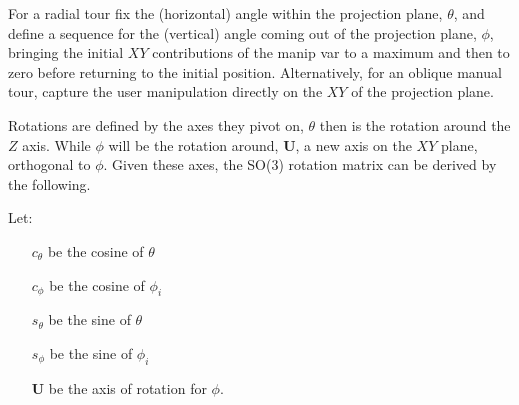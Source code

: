 For a radial tour fix the (horizontal) angle within the projection
plane, \(\theta\), and define a sequence for the (vertical) angle coming
out of the projection plane, \(\phi\), bringing the initial \(XY\)
contributions of the manip var to a maximum and then to zero before
returning to the initial position. Alternatively, for an oblique manual
tour, capture the user manipulation directly on the \(XY\) of the
projection plane.

Rotations are defined by the axes they pivot on, \(\theta\) then is the
rotation around the \(Z\) axis. While \(\phi\) will be the rotation
around, \(\textbf{U}\), a new axis on the \(XY\) plane, orthogonal to
\(\phi\). Given these axes, the SO(3) rotation matrix can be derived by
the following.

Let:

\begin{itemize}
  \item[$c_\theta$] be the cosine of $\theta$
  \item[$c_\phi$]   be the cosine of $\phi_i$
  \item[$s_\theta$] be the sine of   $\theta$
  \item[$s_\phi$]   be the sine of   $\phi_i$
  \item[$\textbf{U}$] be the axis of rotation for $\phi$.
\end{itemize}

